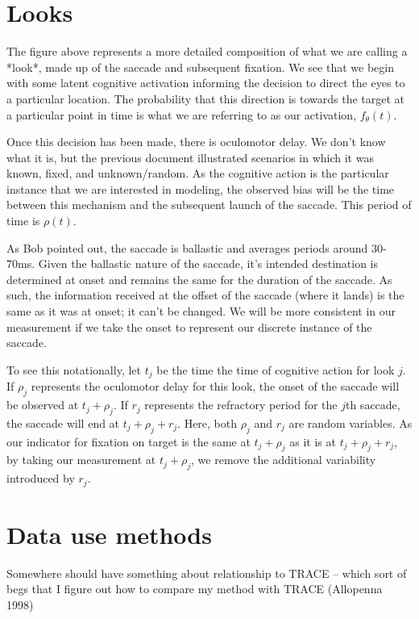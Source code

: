 \documentclass{article}
\begin{document}
\section{Looks}


The figure above represents a more detailed composition of what we are calling a *look*, made up of the saccade and subsequent fixation. We see that we begin with some latent cognitive activation informing the decision to direct the eyes to a particular location. The probability that this direction is towards the target at a particular point in time is what we are referring to as our activation, $f_{\theta}(t)$.

Once this decision has been made, there is oculomotor delay. We don't know what it is, but the previous document illustrated scenarios in which it was known, fixed, and unknown/random. As the cognitive action is the particular instance that we are interested in modeling, the observed bias will be the time between this mechanism and the subsequent launch of the saccade. This period of time is $\rho(t)$.

As Bob pointed out, the saccade is ballastic and averages periods around 30-70ms. Given the ballastic nature of the saccade, it's intended destination is determined at onset and remains the same for the duration of the saccade. As such, the information received at the offset of the saccade (where it lands) is the same as it was at onset; it can't be changed. We will be more consistent in our measurement if we take the onset to represent our discrete instance of the saccade. 

To see this notationally, let $t_j$ be the time the time of cognitive action for look $j$. If $\rho_j$ represents the oculomotor delay for this look, the onset of the saccade will be observed at $t_j + \rho_j$. If $r_j$ represents the refractory period for the  $j$th saccade, the saccade will end at $t_j + \rho_j + r_j$. Here, both $\rho_j$ and $r_j$ are random variables. As our indicator for fixation on target is the same at $t_j + \rho_j$ as it is at $t_j + \rho_j + r_j$, by taking our measurement at $t_j + \rho_j$, we remove the additional variability introduced by $r_j$. 

\section{Data use methods}

Somewhere should have something about relationship to TRACE -- which sort of begs that I figure out how to compare my method with TRACE (Allopenna 1998)
\end{document}
